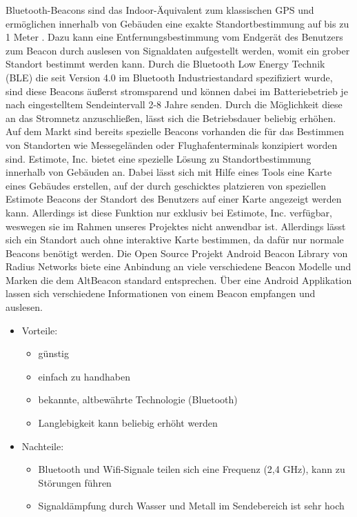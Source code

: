 Bluetooth-Beacons sind das Indoor-Äquivalent zum klassischen GPS und
ermöglichen innerhalb von Gebäuden eine exakte Standortbestimmung auf bis zu
1 Meter \citep{insoft}.
Dazu kann eine Entfernungsbestimmung vom Endgerät des Benutzers zum Beacon
durch auslesen von Signaldaten aufgestellt werden, womit ein grober Standort
bestimmt werden kann. Durch die Bluetooth Low Energy Technik (BLE) die seit
Version 4.0 im Bluetooth Industriestandard spezifiziert wurde, sind diese
Beacons äußerst stromsparend und können dabei im Batteriebetrieb je nach
eingestelltem Sendeintervall 2-8 Jahre \citep{insoft}
senden. Durch die Möglichkeit diese an das Stromnetz anzuschließen, lässt sich
die Betriebsdauer beliebig erhöhen.
Auf dem Markt sind bereits spezielle Beacons vorhanden die für das Bestimmen
von Standorten wie \zB Messegeländen oder Flughafenterminals konzipiert worden
sind. Estimote, Inc. \citep{estimote)} 
bietet eine spezielle Lösung zu Standortbestimmung innerhalb von Gebäuden an.
Dabei lässt sich mit Hilfe eines Tools eine Karte eines Gebäudes erstellen,
auf der durch geschicktes platzieren von speziellen Estimote Beacons \citep{estimote} 
der Standort des Benutzers auf einer Karte \citep{estimote}
angezeigt werden kann. Allerdings ist diese Funktion nur exklusiv bei Estimote, Inc. \citep{estimote}
verfügbar, weswegen sie im Rahmen unseres Projektes nicht anwendbar ist.
Allerdings lässt sich ein Standort auch ohne interaktive Karte bestimmen, da
dafür nur normale Beacons benötigt werden. Die Open Source Projekt Android Beacon Library \citep{http://altbeacon.github.io/android-beacon-library/index.html}
von Radius Networks \citep{https://www.radiusnetworks.com/} biete eine
Anbindung an viele verschiedene Beacon Modelle und Marken die dem AltBeacon standard\citep{http://altbeacon.org/}
entsprechen. Über \zB eine Android Applikation lassen sich verschiedene
Informationen von einem Beacon empfangen und auslesen.

\begin{itemize}
	\item Vorteile:
	\begin{itemize}
		\item günstig
		\item einfach zu handhaben
		\item bekannte, altbewährte Technologie (Bluetooth)
		\item Langlebigkeit kann beliebig erhöht werden
	\end{itemize}
	\item Nachteile:
	\begin{itemize}
		\item Bluetooth und Wifi-Signale teilen sich eine Frequenz (2,4 GHz), kann zu Störungen führen
		\item Signaldämpfung durch Wasser und Metall im Sendebereich ist sehr hoch
	\end{itemize}
\end{itemize}

